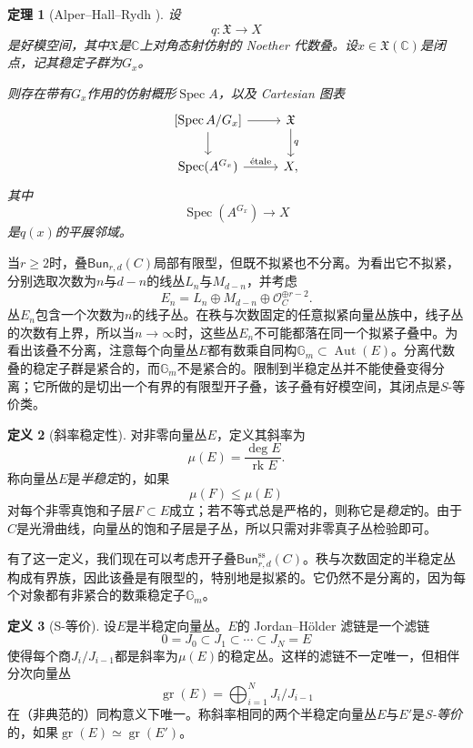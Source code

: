 \documentclass{amsart}
\newtheorem{thm}{定理}[section]
\theoremstyle{definition}
\newtheorem{defn}[thm]{定义}
\theoremstyle{remark}
\theoremstyle{plain}
\theoremstyle{definition}
\theoremstyle{remark}
\newcommand{\G}{\mathbb{G}}
\newcommand{\C}{\mathbb{C}}
\newcommand{\mc}[1]{\mathcal{#1}}
\newcommand{\mf}[1]{\mathfrak{#1}}
\newcommand{\mr}[1]{\mathrm{#1}}
\newcommand{\on}[1]{\operatorname{#1}}
\newcommand{\ms}[1]{\mathsf{#1}}
\newcommand{\1}{\mathbf{1}}
\newcommand{\2}{\mathbf{2}}
\newcommand{\3}{\mathbf{3}}
\begin{document}
\begin{thm}[Alper--Hall--Rydh {\cite{AHR2020}}]
    设
    \[
        q\colon \mf{X}\longrightarrow X
    \]
    是好模空间，其中\(\mf{X}\)是\(\C\)上对角态射仿射的 Noether 代数叠。设\(x\in\mf{X}(\C)\)是闭点，记其稳定子群为\(G_x\)。

    则存在带有\(G_x\)作用的仿射概形\(\on{Spec}A\)，以及 Cartesian 图表
    \[
        \begin{tikzcd}
            {[\on{Spec}A/G_x]}
                \arrow[r]
                \arrow[d]
            & \mf{X}
                \arrow[d, "q"]
            \\
            \on{Spec}(A^{G_x})
                \arrow[r, "\mathrm{\acute{e}tale}"]
            & X,
        \end{tikzcd}
    \]
    其中
    \[
        \on{Spec}(A^{G_x})\longrightarrow X
    \]
    是\(q(x)\)的平展邻域。
\end{thm}

当\(r\geq 2\)时，叠\(\ms{Bun}_{r,d}(C)\)局部有限型，但既不拟紧也不分离。为看出它不拟紧，分别选取次数为\(n\)与\(d-n\)的线丛\(L_n\)与\(M_{d-n}\)，并考虑
\[
    E_n=L_n\oplus M_{d-n}\oplus\mc{O}_C^{\oplus r-2}.
\]
丛\(E_n\)包含一个次数为\(n\)的线子丛。在秩与次数固定的任意拟紧向量丛族中，线子丛的次数有上界，所以当\(n\to\infty\)时，这些丛\(E_n\)不可能都落在同一个拟紧子叠中。为看出该叠不分离，注意每个向量丛\(E\)都有数乘自同构\(\G_m\subset\on{Aut}(E)\)。分离代数叠的稳定子群是紧合的，而\(\G_m\)不是紧合的。限制到半稳定丛并不能使叠变得分离；它所做的是切出一个有界的有限型开子叠，该子叠有好模空间，其闭点是\(S\)-等价类。

\begin{defn}[斜率稳定性]
    对非零向量丛\(E\)，定义其斜率为
    \[ \mu(E)=\frac{\deg E}{\on{rk}E}. \]
    称向量丛\(E\)是\textit{半稳定}的，如果
    \[ \mu(F)\leq\mu(E) \]
    对每个非零真饱和子层\(F\subset E\)成立；若不等式总是严格的，则称它是\textit{稳定}的。由于\(C\)是光滑曲线，向量丛的饱和子层是子丛，所以只需对非零真子丛检验即可。
\end{defn}

有了这一定义，我们现在可以考虑开子叠\(\ms{Bun}_{r,d}^{\mr{ss}}(C)\)。秩与次数固定的半稳定丛构成有界族，因此该叠是有限型的，特别地是拟紧的。它仍然不是分离的，因为每个对象都有非紧合的数乘稳定子\(\G_m\)。

\begin{defn}[S-等价]
    设\(E\)是半稳定向量丛。\(E\)的 Jordan--H\"older 滤链是一个滤链
    \[ 0=J_0\subset J_1\subset\cdots\subset J_N=E \]
    使得每个商\(J_i/J_{i-1}\)都是斜率为\(\mu(E)\)的稳定丛。这样的滤链不一定唯一，但相伴分次向量丛
    \[
        \on{gr}(E)=\bigoplus_{i=1}^N J_i/J_{i-1}
    \]
    在（非典范的）同构意义下唯一。称斜率相同的两个半稳定向量丛\(E\)与\(E'\)是\textit{S-等价}的，如果\(\on{gr}(E)\simeq\on{gr}(E')\)。
\end{defn}
\end{document}
